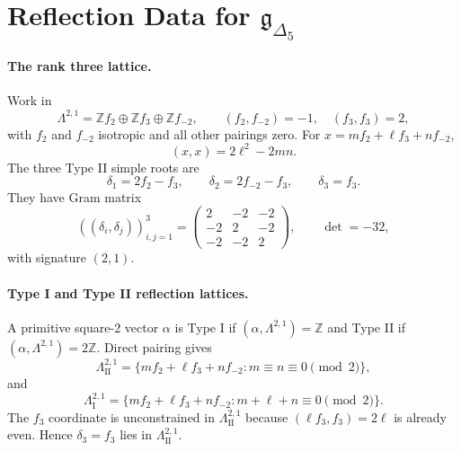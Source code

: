 
\providecommand{\kBKM}{\kappa_{\mathrm{BKM}}}
\providecommand{\kch}{\kappa_{\mathrm{ch}}}
\providecommand{\kcat}{\kappa_{\mathrm{cat}}}
\providecommand{\kfib}{\kappa_{\mathrm{fiber}}}
\providecommand{\Lat}{\Lambda}
\providecommand{\WII}{W^{(2)}_{\mathrm{II}}}
\providecommand{\WI}{W^{(2)}_{\mathrm{I}}}
\providecommand{\cP}{\mathcal{P}}
\providecommand{\Delfive}{\Delta_{5}}
\providecommand{\PhiTen}{\Phi_{10}^{\mathrm{un}}}
\providecommand{\phioo}{\phi_{0,1}}
\providecommand{\LII}{\Lat^{2,1}_{\mathrm{II}}}
\providecommand{\LI}{\Lat^{2,1}_{\mathrm{I}}}
\providecommand{\Z}{\mathbb{Z}}

\section*{Reflection Data for $\mathfrak{g}_{\Delfive}$}

\paragraph{The rank three lattice.}
Work in
\[
  \Lat^{2,1}
  =
  \Z f_2\oplus \Z f_3\oplus \Z f_{-2},
  \qquad
  (f_2,f_{-2})=-1,\quad (f_3,f_3)=2,
\]
with $f_2$ and $f_{-2}$ isotropic and all other pairings zero. For
$x=mf_2+\ell f_3+nf_{-2}$,
\[
  (x,x)=2\ell^2-2mn.
\]
The three Type II simple roots are
\[
  \delta_1=2f_2-f_3,\qquad
  \delta_2=2f_{-2}-f_3,\qquad
  \delta_3=f_3 .
\]
They have Gram matrix
\[
  ((\delta_i,\delta_j))_{i,j=1}^3
  =
  \begin{pmatrix}
    2&-2&-2\\
    -2&2&-2\\
    -2&-2&2
  \end{pmatrix},
  \qquad \det=-32,
\]
with signature $(2,1)$.

\paragraph{Type I and Type II reflection lattices.}
A primitive square-$2$ vector $\alpha$ is Type I if
$(\alpha,\Lat^{2,1})=\Z$ and Type II if
$(\alpha,\Lat^{2,1})=2\Z$. Direct pairing gives
\[
  \LII
  =
  \{mf_2+\ell f_3+nf_{-2}:m\equiv n\equiv0\pmod2\},
\]
and
\[
  \LI
  =
  \{mf_2+\ell f_3+nf_{-2}:m+\ell+n\equiv0\pmod2\}.
\]
The $f_3$ coordinate is unconstrained in $\LII$ because
$(\ell f_3,f_3)=2\ell$ is already even. Hence $\delta_3=f_3$ lies in
$\LII$.

